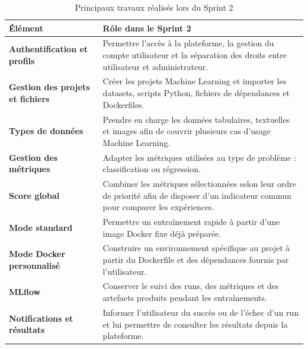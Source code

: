 \begin{table}[H]

\centering
\small

\renewcommand{\arraystretch}{1.16}
\setlength{\tabcolsep}{5pt}

\begin{tabular}{|p{4cm}|p{9.2cm}|}

\hline

\rowcolor{cyan!20}
\textbf{Élément}
&
\textbf{Rôle dans le Sprint 2}
\\
\hline

\textbf{Authentification et profils}
&
Permettre l'accès à la plateforme, la gestion du compte utilisateur
et la séparation des droits entre utilisateur et administrateur.
\\
\hline

\rowcolor{cyan!7}
\textbf{Gestion des projets et fichiers}
&
Créer les projets Machine Learning et importer les datasets, scripts
Python, fichiers de dépendances et Dockerfiles.
\\
\hline

\textbf{Types de données}
&
Prendre en charge les données tabulaires, textuelles et images afin
de couvrir plusieurs cas d'usage Machine Learning.
\\
\hline

\rowcolor{cyan!7}
\textbf{Gestion des métriques}
&
Adapter les métriques utilisées au type de problème :
classification ou régression.
\\
\hline

\textbf{Score global}
&
Combiner les métriques sélectionnées selon leur ordre de priorité
afin de disposer d'un indicateur commun pour comparer les expériences.
\\
\hline

\rowcolor{cyan!7}
\textbf{Mode standard}
&
Permettre un entraînement rapide à partir d'une image Docker fixe
déjà préparée.
\\
\hline

\textbf{Mode Docker personnalisé}
&
Construire un environnement spécifique au projet à partir du
Dockerfile et des dépendances fournis par l'utilisateur.
\\
\hline

\rowcolor{cyan!7}
\textbf{MLflow}
&
Conserver le suivi des runs, des métriques et des artefacts produits
pendant les entraînements.
\\
\hline

\textbf{Notifications et résultats}
&
Informer l'utilisateur du succès ou de l'échec d'un run et lui
permettre de consulter les résultats depuis la plateforme.
\\
\hline

\end{tabular}

\caption{Principaux travaux réalisés lors du Sprint 2}
\label{tab:travaux-sprint2}

\end{table}


